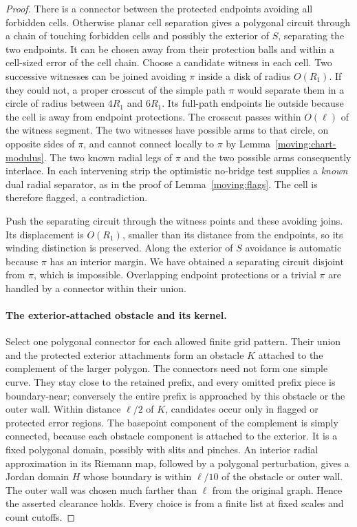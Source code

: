 \begin{proof}
There is a connector between the protected endpoints avoiding all
forbidden cells.  Otherwise planar cell separation gives a polygonal
circuit through a chain of touching forbidden cells and possibly the
exterior of $S$, separating the two endpoints.  It can be chosen
away from their protection balls and within a cell-sized error of
the cell chain.  Choose a candidate witness in each cell.  Two
successive witnesses can be joined avoiding $\pi$ inside a disk of
radius $O(R_1)$.  If they could not, a proper crosscut of the simple
path $\pi$ would separate them in a circle of radius between
$4R_1$ and $6R_1$.  Its full-path endpoints lie outside because the
cell is away from endpoint protections.  The crosscut passes within
$O(\ell)$ of the witness segment.  The two witnesses have possible
arms to that circle, on opposite sides of $\pi$, and cannot connect
locally to $\pi$ by Lemma~\ref{moving:chart-modulus}.  The two known
radial legs of $\pi$ and the two possible arms consequently interlace.
In each intervening strip the optimistic no-bridge test supplies a
\emph{known} dual radial separator, as in the proof of
Lemma~\ref{moving:flags}.  The cell is therefore flagged, a
contradiction.

Push the separating circuit through the witness points and these
avoiding joins.  Its displacement is $O(R_1)$, smaller than its
distance from the endpoints, so its winding distinction is preserved.
Along the exterior of $S$ avoidance is automatic because $\pi$ has
an interior margin.  We have obtained a separating circuit disjoint
from $\pi$, which is impossible.  Overlapping endpoint protections
or a trivial $\pi$ are handled by a connector within their union.

\paragraph{The exterior-attached obstacle and its kernel.}
Select one polygonal connector for each allowed finite grid pattern.
Their union and the protected exterior attachments form an obstacle
$K$ attached to the complement of the larger polygon.  The connectors
need not form one simple curve.  They stay close to the retained
prefix, and every omitted prefix piece is boundary-near; conversely
the entire prefix is approached by this obstacle or the outer wall.
Within distance $\ell/2$ of $K$, candidates occur only in flagged or
protected error regions.  The basepoint component of the complement
is simply connected, because each obstacle component is attached to
the exterior.  It is a fixed polygonal domain, possibly with slits
and pinches.  An interior radial approximation in its Riemann map,
followed by a polygonal perturbation, gives a Jordan domain $H$ whose
boundary is within $\ell/10$ of the obstacle or outer wall.
The outer wall was chosen much farther than $\ell$ from the original
graph.  Hence the asserted clearance holds.  Every choice is from a
finite list at fixed scales and count cutoffs.


\end{proof}
